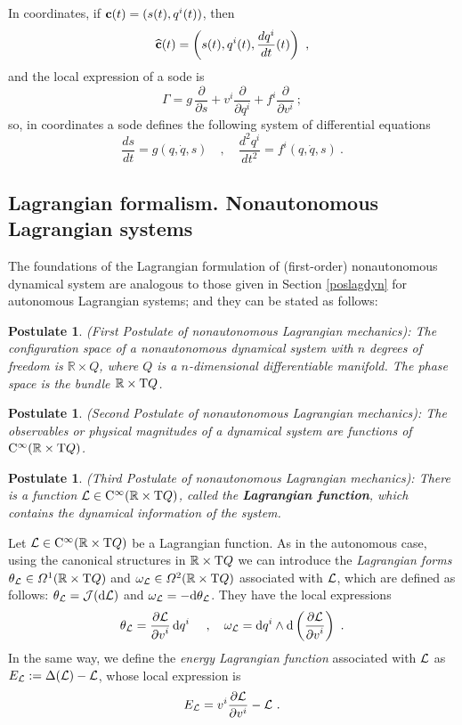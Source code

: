 \documentclass[12pt]{report}
\newtheorem{pos}[teor]{Postulate}
\def\derpar#1#2{\frac{\partial{#1}}{\partial{#2}}}
\def\df{{\mit\Omega}}
\def\Lag{{\cal L}}
\def\d{{\rm d}}
\def\Real{\mathbb{R}}
\def\Tan{{\rm T}}
\def\Cinfty{{\rm C}^\infty}
\begin{document}
In coordinates, if 
${\bf c}(t)=(s(t),q^i(t))$, 
then
$$
\widehat{\bf c}(t) =
\left(s(t),q^i(t),\frac{d q^i}{d t}(t)\right) \ ,
$$
and the local expression of a {\sc sode} is
$$
\Gamma= g\,\frac{\partial}{\partial s} +
v^i \frac{\partial}{\partial q^i} +
f^i \frac{\partial}{\partial v^i} \ ;
$$
so, in coordinates a {\sc sode} defines the following system of
differential equations
$$
\frac{d s}{d t}=g(q,\dot q,s)  \quad , \quad  
\frac{d^2 q^i}{d t^2}=f^i(q,\dot q,s) \ .
$$


\subsection{Lagrangian formalism. Nonautonomous Lagrangian systems}


The foundations of the Lagrangian formulation of
(first-order) nonautonomous dynamical system are analogous to those given
in Section \ref{poslagdyn} for autonomous Lagrangian systems; 
and they can be stated as follows:

\begin{pos}
{\rm (First Postulate of nonautonomous Lagrangian mechanics\/)}:
The configuration space of a nonautonomous dynamical system with $n$ degrees of freedom 
is $\Real\times Q$, where $Q$ is a $n$-dimensional differentiable manifold.
The phase space is the bundle $\Real\times\Tan Q$.
\end{pos}

\begin{pos}
{\rm (Second Postulate of nonautonomous Lagrangian mechanics\/)}:
The observables or physical magnitudes of a 
dynamical system are functions of $\Cinfty (\Real\times\Tan Q)$.
\end{pos}

\begin{pos}
{\rm (Third Postulate of nonautonomous Lagrangian mechanics\/)}:
There is a function $\Lag\in\Cinfty (\Real\times\Tan Q)$, 
called the \textbf{Lagrangian function},
which contains the dynamical information of the system.
\end{pos}

Let $\Lag\in\Cinfty(\Real\times\Tan Q)$ be a Lagrangian function.
As in the autonomous case, using the canonical structures in 
$\Real\times\Tan Q$ we can introduce the {\sl Lagrangian forms} $\theta_\Lag\in\df^1(\Real\times\Tan Q)$ and
 $\omega_\Lag\in\df^2(\Real\times\Tan Q)$ associated with $\Lag$,
 which are defined as follows:
 $\theta_\Lag={\cal J}(\d\Lag)$ and $\omega_\Lag=-\d\theta_\Lag$.
They have the  local expressions
$$
\theta_\Lag= \displaystyle\frac{\displaystyle\partial
\Lag}{\displaystyle\partial v^i}\, \d q^i\ \quad ,\quad 
\omega_\Lag=\d q^i\wedge\d \left(\frac{\displaystyle\partial
\Lag}{\displaystyle\partial v^i}\right) \  .
$$
In the same way, we define the {\sl energy Lagrangian function} associated with $\Lag$ as
$E_\Lag:=\Delta(\Lag)-\Lag$, whose local expression is
$$
E_\Lag=v^i\derpar{\Lag}{v^i}-\Lag\ .
$$
\end{document}
